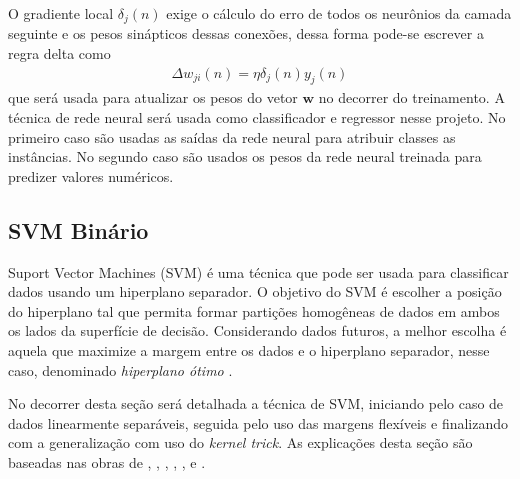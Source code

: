 O gradiente local \(\delta_{j}(n)\) exige o cálculo do erro de todos os neurônios da camada seguinte e os pesos sinápticos dessas conexões, dessa forma pode-se escrever a regra delta como
\begin{align}
\Delta w_{ji}(n) = \eta \delta_{j}(n)y_{j}(n)
\end{align}
que será usada para atualizar os pesos do vetor \(\mathbf{w}\) no decorrer do treinamento. A técnica de rede neural será usada como classificador e regressor nesse projeto. No primeiro caso são usadas as saídas da rede neural para atribuir classes as instâncias. No segundo caso são usados os pesos da rede neural treinada para predizer valores numéricos.

\subsection{SVM Binário} \label{SEC_CONCEITOS_FUNDAMENTAIS_SVM_CLASSIFICACAO}
Suport Vector Machines (SVM) é uma técnica que pode ser usada para classificar dados usando um hiperplano separador. O objetivo do SVM é escolher a posição do hiperplano tal que permita formar partições homogêneas de dados em ambos os lados da superfície de decisão. Considerando dados futuros, a melhor escolha é aquela que maximize a margem entre os dados e o hiperplano separador, nesse caso, denominado \emph{hiperplano ótimo} \cite{MachineLearningwithR2013}. 

No decorrer desta seção será detalhada a técnica de SVM, iniciando pelo caso de dados linearmente separáveis, seguida pelo uso das margens f\mbox{}lexíveis e finalizando com a generalização com uso do \emph{kernel trick}. As explicações desta seção são baseadas nas obras de , , , , , \cite{Cristianini1999} e \cite{Chang2011}.

